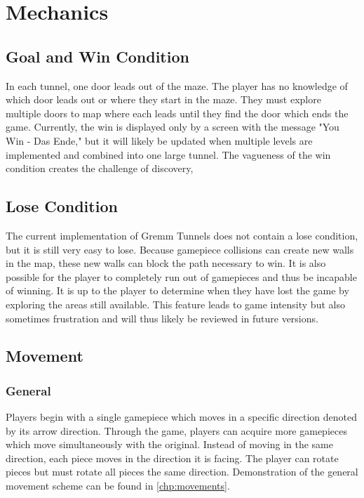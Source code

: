 \documentclass{scrreprt}
\begin{document}
	\chapter{Mechanics}		
		\section{Goal and Win Condition}
			In each tunnel, one door leads out of the maze. The player has no knowledge of which door leads out or where they start in the maze. They must explore multiple doors to map where each leads until they find the door which ends the game. Currently, the win is displayed only by a screen with the message "You Win - Das Ende," but it will likely be updated when multiple levels are implemented and combined into one large tunnel. The vagueness of the win condition creates the challenge of discovery, 
		
		\section{Lose Condition}
			The current implementation of Gremm Tunnels does not contain a lose condition, but it is still very easy to lose. Because gamepiece collisions can create new walls in the map, these new walls can block the path necessary to win. It is also possible for the player to completely run out of gamepieces and thus be incapable of winning. It is up to the player to determine when they have lost the game by exploring the areas still available. This feature leads to game intensity but also sometimes frustration and will thus likely be reviewed in future versions.
			
		\section{Movement}
			
			\subsection{General}
				Players begin with a single gamepiece which moves in a specific direction denoted by its arrow direction. Through the game, players can acquire more gamepieces which move simultaneously with the original. Instead of moving in the same direction, each piece moves in the direction it is facing. The player can rotate pieces but must rotate all pieces the same direction. Demonstration of the general movement scheme can be found in \autoref{chp:movements}. 
			
\end{document}
